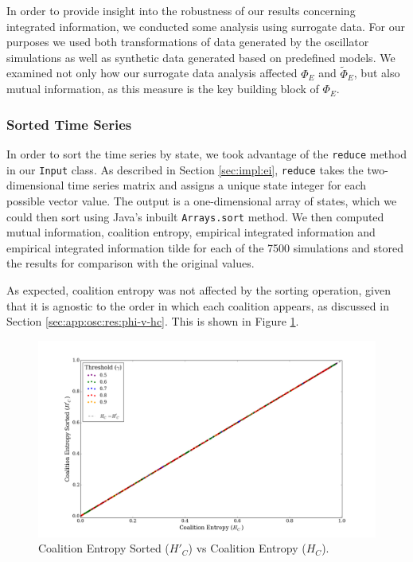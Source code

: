 \documentclass[a4paper,11pt]{article}
\begin{document}
In order to provide insight into the robustness of our results concerning integrated information, we conducted some analysis using surrogate data. For our purposes we used both transformations of data generated by the oscillator simulations as well as synthetic data generated based on predefined models. We examined not only how our surrogate data analysis affected $\Phi_E$ and $\widetilde{\Phi}_E$, but also mutual information, as this measure is  the key building block of $\Phi_E$.

\subsubsection{Sorted Time Series}
\label{sec:app:osc:surrogate:sorted}

In order to sort the time series by state, we took advantage of the \texttt{reduce} method in our \texttt{Input} class. As described in Section \ref{sec:impl:ei}, \texttt{reduce} takes the two-dimensional time series matrix and assigns a unique state integer for each possible vector value. The output is a one-dimensional array of states, which we could then sort using Java's inbuilt \texttt{Arrays.sort} method. We then computed mutual information, coalition entropy, empirical integrated information and empirical integrated information tilde for each of the 7500 simulations and stored the results for comparison with the original values.

As expected, coalition entropy was not affected by the sorting operation, given that it is agnostic to the order in which each coalition appears, as discussed in Section \ref{sec:app:osc:res:phi-v-hc}. This is shown in Figure \ref{fig:hc_sorted_vs_hc}.

\begin{figure}[H]
\begin{center}
\includegraphics[scale = 0.35]{figures/hc_sorted_vs_hc}
\caption{
	Coalition Entropy Sorted ($H'_C$) vs Coalition Entropy ($H_C$).
	\label{fig:hc_sorted_vs_hc}
}
\end{center}
\end{figure}
\end{document}
